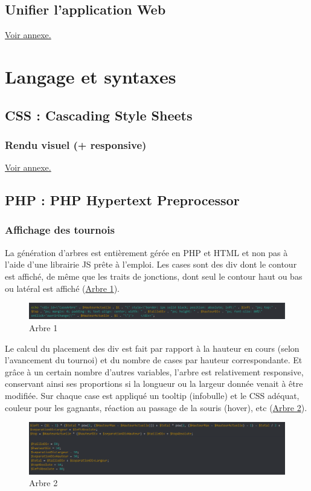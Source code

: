 \documentclass[12pt]{report}
\begin{document}
        \subsection{Unifier l'application Web}
\par
\hypertarget{retour-unifier}{}
\hyperlink{annexe-unifier-web}{Voir annexe.} 
\newpage
        \section{Langage et syntaxes}
        \subsection{CSS : Cascading Style Sheets}
        \subsubsection{Rendu visuel (+ responsive)}
\par
\hypertarget{retour-rendu-visuel}{}
\hyperlink{annexe-rendu-visuel}{Voir annexe.}
        \subsection{PHP : PHP Hypertext Preprocessor}
         \subsubsection{Affichage des tournois}
\par
La génération d’arbres est entièrement gérée en PHP et HTML et non pas à l’aide d’une librairie JS prête à l’emploi. Les cases sont des div dont le contour est affiché, de même que les traits de jonctions, dont seul le contour haut ou bas ou latéral est affiché (\hyperlink{fig-arbre1}{Arbre 1}).
 \begin{figure}[h]
 \hypertarget{fig-arbre1}{}
			\centering
				\includegraphics[width=17cm]{figures/pt-arbre1.png}
			\caption{Arbre 1}
\end{figure}
\bigskip
\par
Le calcul du placement des div est fait par rapport à la hauteur en cours (selon l’avancement du tournoi) et du nombre de cases par hauteur correspondante. Et grâce à un certain nombre d’autres variables, l’arbre est relativement responsive, conservant ainsi ses proportions si la longueur ou la largeur donnée venait à être modifiée. Sur chaque case est appliqué un tooltip (infobulle) et le CSS adéquat, couleur pour les gagnants, réaction au passage de la souris (hover), etc (\hyperlink{fig-arbre2}{Arbre 2}).
\begin{figure}[h]
\hypertarget{fig-arbre2}{}
			\centering
				\includegraphics[width=17cm]{figures/pt-arbre2.png}
			\caption{Arbre 2}
\end{figure}
\end{document}
